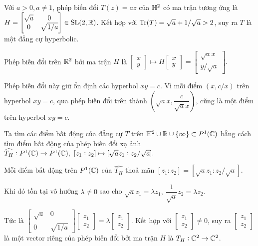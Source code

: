 \begin{exam*}
    Với $a >0, a\neq 1$, phép biến đổi $T(z) = az $ của $\mathbb{H}^2$ có ma trận tương ứng là $H = \begin{bmatrix}
        \sqrt{a} & 0\\
        0 & \sqrt{1/a}
    \end{bmatrix} \in \operatorname{SL}(2,\mathbb{R})$. Kết hợp với $\operatorname{Tr}(T) = \sqrt{a} + 1/\sqrt{a}> 2$, suy ra $T$ là một đẳng cự hyperbolic.

    Phép biến đổi trên $\mathbb{R}^2$ bởi ma trận $H$ là 
    $\begin{bmatrix}
        x \\ y
    \end{bmatrix}
    \mapsto 
    H \begin{bmatrix}
        x \\ y
    \end{bmatrix} = \begin{bmatrix}
        \sqrt{a}x\\ y/\sqrt{a} 
    \end{bmatrix}.$
    
    Phép biến đổi này giữ ổn định các hyperbol $xy = c$. Vì mỗi điểm $(x, c/x)$ trên hyperbol $xy =c$, qua phép biến đổi trên thành $\left(\sqrt{a}x,\dfrac{c}{\sqrt{a}x}\right)$, cũng là một điểm trên hyperbol $xy = c$.
    
    Ta tìm các điểm bất động của đẳng cự $T$ trên $\mathbb{H}^2 \cup \mathbb{R} \cup \{\infty\} \subset P^1(\mathbb{C})$ bằng cách tìm điểm bất động của phép biến đổi xạ ảnh $\widehat{T_H}: P^1(\mathbb{C}) \to P^1(\mathbb{C}),~ [z_1:z_2] \mapsto [\sqrt{a}z_1:z_2/\sqrt{a}].$
    
    Mỗi điểm bất động trên $P^1(\mathbb{C})$ của $\widehat{T_H}$ thoả mãn $[z_1:z_2] = [\sqrt{a}z_1:z_2/\sqrt{a}]$. 
    
    Khi đó tồn tại vô hướng $\lambda \neq 0$ sao cho $\sqrt{a}z_1 = \lambda z_1,~\dfrac{1}{\sqrt{a}}z_2 =\lambda z_2.$
    
    Tức là $\begin{bmatrix}
        \sqrt{a} & 0\\
        0 & \sqrt{1/a}
        \end{bmatrix}\begin{bmatrix}
            z_1\\z_2 
        \end{bmatrix}= \lambda \begin{bmatrix}
            z_1\\z_2
        \end{bmatrix}$. Kết hợp với $\begin{bmatrix}
        z_1\\z_2
    \end{bmatrix} \neq 0$, suy ra $\begin{bmatrix}
            z_1\\z_2
        \end{bmatrix}$ là một vector riêng của phép biến đổi bởi ma trận $H$ là $T_H:\mathbb{C}^2 \to \mathbb{C}^2$. 


\end{exam*}
